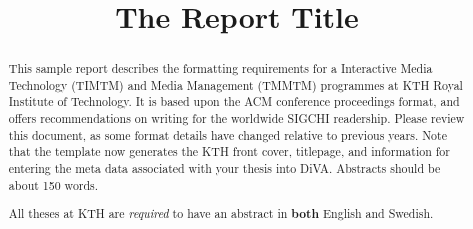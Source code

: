 \documentclass[manuscript, screen]{timtm}
\newcommand{\alttitle}[1]{}
\newcommand{\altsubtitle}[1]{}
\begin{document}


\title{The Report Title}

\alttitle{Detta är den svenska översättningen av titeln}
\altsubtitle{Detta är den svenska översättningen av undertiteln}
\makeatletter


\author{\@authorsFirstname\space\@authorsLastname}
\email{\@email}
\author{\@secondAuthorsFirstname\space\@secondAuthorsLastname}
\email{\@secondemail}
\makeatother

\begin{abstract}
\begin{scontents}[store-env=abstracts,print-env=false]
  This sample report describes the formatting
  requirements for a Interactive Media Technology (TIMTM) and Media Management (TMMTM) programmes at KTH Royal Institute of Technology. It is based upon the ACM conference proceedings format, and offers
  recommendations on writing for the worldwide SIGCHI
  readership. Please review this document, as some format details have changed
  relative to previous years. Note that the template now generates the KTH front cover, titlepage, and information for entering the meta data associated with your thesis into DiVA. Abstracts should be about 150 words.
  
  All theses at KTH are \textit{required} to have an abstract in \textbf{both} English and Swedish.
 \end{scontents}
\end{abstract}
\end{document}
